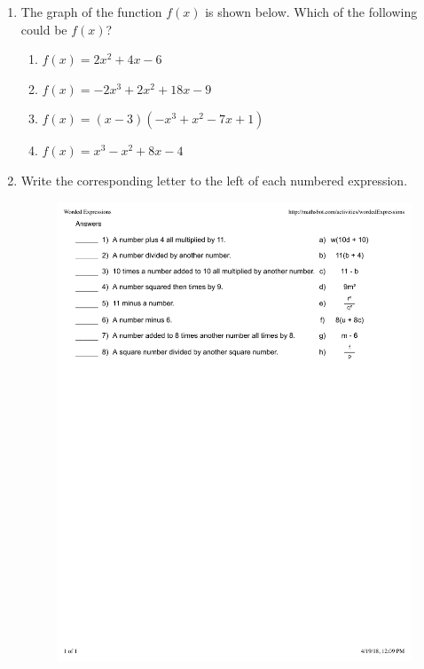 \documentclass[12pt, oneside]{article}
\begin{document}
\begin{enumerate}
\newpage
\item The graph of the function $f(x)$ is shown below. Which of the following could be $f(x)$?
\begin{enumerate}
    \item $f(x)=2x^2+4x-6$
    \item $f(x)=-2x^3+2x^2+18x-9$
    \item $f(x)=(x-3)(-x^3+x^2-7x+1)$
    \item $f(x)=x^3-x^2+8x-4$
\end{enumerate}
\begin{center}
\end{center}
\item Write the corresponding letter to the left of each numbered expression.
\begin{figure}[!ht]
    \centering
    \includegraphics[width=1.0\textwidth]{0419Test_WordedExpressions.pdf}
\end{figure}


\end{enumerate}
\end{document}

